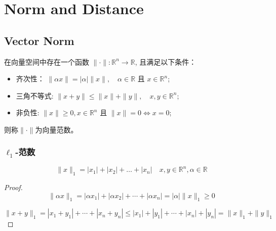 \chapter{Norm and Distance}

\section{Vector Norm}

\begin{definition}
    在向量空间中存在一个函数 $ \|\cdot\|: \mathbb{R}^{n} \rightarrow \mathbb{R} $, 且满足以下条件：

\begin{itemize}
    \item 齐次性： $ \|\alpha x\|=|\alpha|\|x\|, \quad \alpha \in \mathbb{R} $ 且 $ x \in \mathbb{R}^{n} $;
    \item 三角不等式: $ \|x+y\| \leq\|x\|+\|y\|, \quad x, y \in \mathbb{R}^{n} $;
    \item 非负性: $ \|x\| \geq {0}, {x} \in \mathbb{R}^{n} $ 且 $ \|{x}\|=0 \Leftrightarrow {x}=0 $;
\end{itemize}
则称$\|\cdot\|$为向量范数。 
\end{definition}







\subsection{$ \ell_{1} $-范数}

\begin{example}
    \begin{equation} \|x\|_{1}=\left|x_{1}\right|+\left|x_{2}\right|+\ldots+\left|x_{n}\right| \quad x, y \in \mathbb{R}^{n}, \alpha \in \mathbb{R} \end{equation}
\end{example}

\begin{proof}
    \begin{equation} \|\alpha x\|_{1}=\left|\alpha x_{1}\right|+\left|\alpha x_{2}\right|+\cdots+\left|\alpha x_{n}\right|=|\alpha|\|x\|_{1} \geq 0 \end{equation}

    \begin{equation} \|x+y\|_{1}=\left|x_{1}+y_{1}\right|+\cdots+\left|x_{n}+y_{n}\right| \leq\left|x_{1}\right|+\left|y_{1}\right|+\cdots+\left|x_{n}\right|+\left|y_{n}\right|=\|x\|_{1}+\|y\|_{1} \end{equation}
\end{proof}

